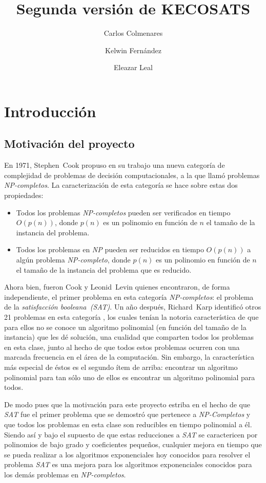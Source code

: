 \documentclass[12pt,lettersize,oneside]{article}
\title{Segunda versión de KECOSATS}
\author{Carlos Colmenares \and Kelwin Fernández \and Eleazar Leal}
\begin{document}
\maketitle
\setlength{\parskip}{2.5mm}
\setlength{\itemsep}{0ex }
\section{Introducción}

\subsection{Motivación del proyecto}
En 1971, Stephen~Cook propuso en su trabajo\cite{Cook} una nueva categoría de complejidad
de problemas de decisión computacionales, a la que llamó problemas
\emph{NP-completos}. La caracterización de esta categoría se hace sobre estas
dos propiedades:
\begin{itemize}
  \item Todos los problemas \emph{NP-completos} pueden ser verificados en tiempo
    $O(p(n))$, donde $p(n)$ es un polinomio en función de $n$ el tamaño de la
    instancia del problema. 
  \item Todos los problemas en \emph{NP} pueden ser reducidos en tiempo
    $O(p(n))$ a algún problema \emph{NP-completo}, donde $p(n)$ es un polinomio
    en función de $n$ el tamaño de la instancia del problema que es reducido.
\end{itemize}

Ahora bien, fueron Cook y Leonid~Levin quienes encontraron, de forma
independiente, el primer problema en esta categoría \emph{NP-completos}: el
problema de la \emph{satisfacción booleana~(SAT)}. Un año después, Richard~Karp
identificó otros 21 problemas en esta categoría \cite{Karp}, los cuales tenían
la notoria característica de que para ellos no se conoce un algoritmo polinomial
(en función del tamaño de la instancia) que les dé solución, una cualidad que
comparten todos los problemas en esta clase, junto al hecho de que todos estos
problemas ocurren con una marcada frecuencia en el área de la computación. Sin
embargo, la característica más especial de éstos es el segundo ítem de arriba:
encontrar un algoritmo polinomial para tan sólo uno de ellos es encontrar un
algoritmo polinomial para todos.

De modo pues que la motivación para este proyecto estriba en el hecho de que
\emph{SAT} fue el primer problema que se demostró que pertenece a
\emph{NP-Completos} y que todos los problemas en esta clase son reducibles en
tiempo polinomial a él. Siendo así y bajo el supuesto de que estas reducciones a
\emph{SAT} se caractericen por polinomios de bajo grado y coeficientes pequeños,
cualquier mejora en tiempo que se pueda realizar a los algoritmos exponenciales
hoy conocidos para resolver el problema \emph{SAT} es una mejora para los
algoritmos exponenciales conocidos para los demás problemas en
\emph{NP-completos}.
\end{document}

